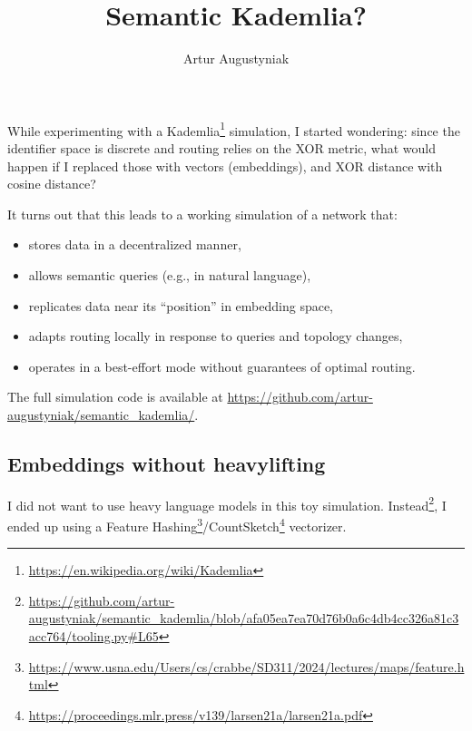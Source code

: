 \documentclass[twocolumn,9pt]{extarticle}
\title{Semantic Kademlia?}
\author{Artur Augustyniak}
\makeatletter
\renewcommand{\maketitle}{
\begin{flushleft}
{\noindent\Huge\bf\@title}\break
\end{flushleft}
}
\makeatother
\begin{document}
\maketitle

While experimenting with a Kademlia\footnote{\url{https://en.wikipedia.org/wiki/Kademlia}} simulation, I started wondering: 
since the identifier space is discrete and routing relies on the XOR metric, what would happen if I replaced those with vectors (embeddings), and XOR distance with cosine distance?

It turns out that this leads to a working simulation of a network that:
\begin{itemize}
  \item stores data in a decentralized manner,
  \item allows semantic queries (e.g., in natural language),
  \item replicates data near its “position” in embedding space,
  \item adapts routing locally in response to queries and topology changes,
  \item operates in a best-effort mode without guarantees of optimal routing.
\end{itemize}


The full simulation code is available at 
\url{https://github.com/artur-augustyniak/semantic_kademlia/}.

\subsection*{Embeddings without heavylifting}

I did not want to use heavy language models in this toy simulation. 
Instead\footnote{\url{https://github.com/artur-augustyniak/semantic_kademlia/blob/afa05ea7ea70d76b0a6c4db4cc326a81c3acc764/tooling.py\#L65}}, 
I ended up using a Feature Hashing\footnote{\url{https://www.usna.edu/Users/cs/crabbe/SD311/2024/lectures/maps/feature.html}}/CountSketch\footnote{\url{https://proceedings.mlr.press/v139/larsen21a/larsen21a.pdf}} vectorizer.

\algrenewcommand\algorithmicindent{0.6em}
\algrenewcommand{}
\algrenewcommand{}
\end{document}
